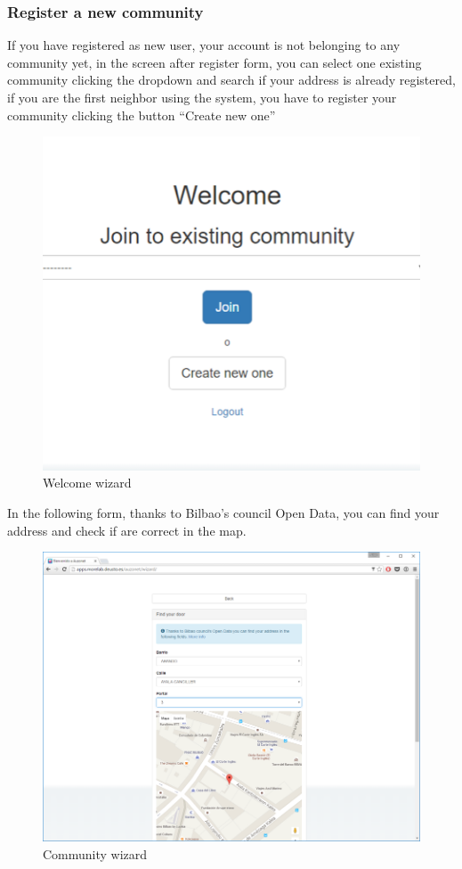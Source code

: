 \documentclass{DeustoFDP}
\begin{document}
\subsubsection{Register a new community}
If you have registered as new user, your account is not belonging to any community yet, in the screen after register form, you can select one existing community clicking the dropdown and search if your address is already registered, if you are the first neighbor using the system, you have to register your community clicking the button “Create new one”
\begin{figure}[h!]
\centering
\includegraphics[width=0.9\linewidth]{fig/Manual/wizard}
\caption[Welcome wizard]{Welcome wizard}
\label{fig:wizard}
\end{figure}

In the following form, thanks to Bilbao’s council Open Data, you can find your address and check if are correct in the map.
\begin{figure}[h!]
\centering
\includegraphics[width=0.9\linewidth]{fig/Manual/address}
\caption[Community wizard]{Community wizard}
\label{fig:address}
\end{figure}
\end{document}
